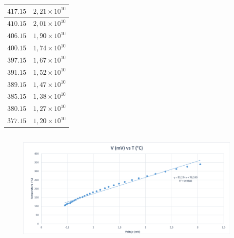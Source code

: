 \documentclass[letterpaper, 12pt]{article}
\begin{document}
\begin{table}[H]
\begin{tabularx}{\linewidth}{|>{\centering\arraybackslash}X|>{\centering\arraybackslash}X|}
            $417.15$       & $2,21 \times 10^{10}$            \\\hline
            $410.15$       & $2,01 \times 10^{10}$            \\\hline
            $406.15$       & $1,90 \times 10^{10}$            \\\hline
            $400.15$       & $1,74 \times 10^{10}$            \\\hline
            $397.15$       & $1,67 \times 10^{10}$            \\\hline
            $391.15$       & $1,52 \times 10^{10}$            \\\hline
            $389.15$       & $1,47 \times 10^{10}$            \\\hline
            $385.15$       & $1,38 \times 10^{10}$            \\\hline
            $380.15$       & $1,27 \times 10^{10}$            \\\hline
            $377.15$       & $1,20 \times 10^{10}$            \\\hline
      \end{tabularx}
\end{table}

\subsection{}

\begin{figure}[H]
      \begin{center}
            \includegraphics[width=\linewidth]{./Images/grafico1.png}
            \caption{}
      \end{center}
\end{figure}

\subsection{}
\end{document}

